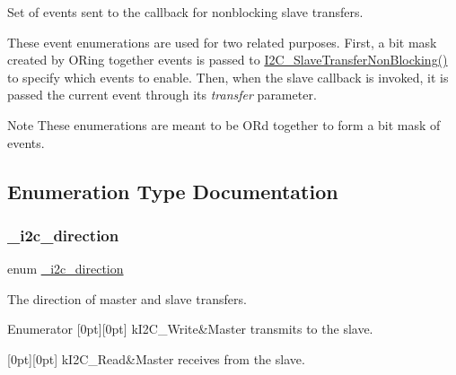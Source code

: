 Set of events sent to the callback for nonblocking slave transfers. 

These event enumerations are used for two related purposes. First, a bit mask created by OR\textquotesingle{}ing together events is passed to \mbox{\hyperlink{group__i2c__driver_gaa387d81ea08a9d4b39cfeb3dfec505f7}{I2\+C\+\_\+\+Slave\+Transfer\+Non\+Blocking()}} to specify which events to enable. Then, when the slave callback is invoked, it is passed the current event through its {\itshape transfer} parameter.

\begin{DoxyNote}{Note}
These enumerations are meant to be OR\textquotesingle{}d together to form a bit mask of events. 
\end{DoxyNote}


\subsection{Enumeration Type Documentation}
\mbox{\label{group__i2c__driver_ga1625497320644ba123718bafdd2c1f39}} 
\subsubsection{\texorpdfstring{\_i2c\_direction}{\_i2c\_direction}}
{\footnotesize\ttfamily enum \mbox{\hyperlink{group__i2c__driver_ga1625497320644ba123718bafdd2c1f39}{\+\_\+i2c\+\_\+direction}}}



The direction of master and slave transfers. 

\begin{DoxyEnumFields}{Enumerator}
[0pt][0pt]{}\mbox{\label{group__i2c__driver_gga1625497320644ba123718bafdd2c1f39a93b476b469c2a4bfed5916b458ae9bb0}} 
k\+I2\+C\+\_\+\+Write&Master transmits to the slave. \\
\hline

[0pt][0pt]{}\mbox{\label{group__i2c__driver_gga1625497320644ba123718bafdd2c1f39a3a7bb24dc8d1c1be8925603eeafe9b30}} 
k\+I2\+C\+\_\+\+Read&Master receives from the slave. \\
\hline

\end{DoxyEnumFields}
\mbox{\label{group__i2c__driver_ga1f1337bbe9d0b184d9dcee31f9ebade2}} 
